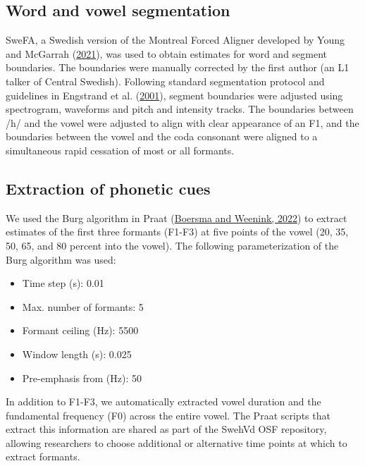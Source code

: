 \documentclass[utf8]{frontiersSCNS}
\providecommand{\tightlist}{%
  \setlength{\itemsep}{0pt}\setlength{\parskip}{0pt}}
\begin{document}
\hypertarget{sec:segmentation}{%
\subsection*{Word and vowel segmentation}\label{sec:segmentation}}

SweFA, a Swedish version of the Montreal Forced Aligner developed by Young and McGarrah (\protect\hyperlink{ref-young2021}{2021}), was used to obtain estimates for word and segment boundaries. The boundaries were manually corrected by the first author (an L1 talker of Central Swedish). Following standard segmentation protocol and guidelines in Engstrand et al. (\protect\hyperlink{ref-engstrand2001}{2001}), segment boundaries were adjusted using spectrogram, waveforms and pitch and intensity tracks. The boundaries between /h/ and the vowel were adjusted to align with clear appearance of an F1, and the boundaries between the vowel and the coda consonant were aligned to a simultaneous rapid cessation of most or all formants.

\hypertarget{sec:cue-extraction}{%
\subsection*{Extraction of phonetic cues}\label{sec:cue-extraction}}

We used the Burg algorithm in Praat (\protect\hyperlink{ref-boersma2022}{Boersma and Weenink, 2022}) to extract estimates of the first three formants (F1-F3) at five points of the vowel (20, 35, 50, 65, and 80 percent into the vowel). The following parameterization of the Burg algorithm was used:

\begin{itemize}
\tightlist
\item
  Time step (s): 0.01
\item
  Max. number of formants: 5
\item
  Formant ceiling (Hz): 5500
\item
  Window length (s): 0.025
\item
  Pre-emphasis from (Hz): 50
\end{itemize}

In addition to F1-F3, we automatically extracted vowel duration and the fundamental frequency (F0) across the entire vowel. The Praat scripts that extract this information are shared as part of the SwehVd OSF repository, allowing researchers to choose additional or alternative time points at which to extract formants.
\end{document}
